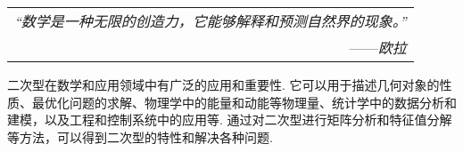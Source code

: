 \begin{flushright}
    \begin{tabular}{r||}
        \textit{“数学是一种无限的创造力，它能够解释和预测自然界的现象。”}\\
        ——\textit{欧拉}
    \end{tabular}
\end{flushright}

二次型在数学和应用领域中有广泛的应用和重要性. 它可以用于描述几何对象的性质、最优化问题的求解、物理学中的能量和动能等物理量、统计学中的数据分析和建模，以及工程和控制系统中的应用等. 通过对二次型进行矩阵分析和特征值分解等方法，可以得到二次型的特性和解决各种问题. 